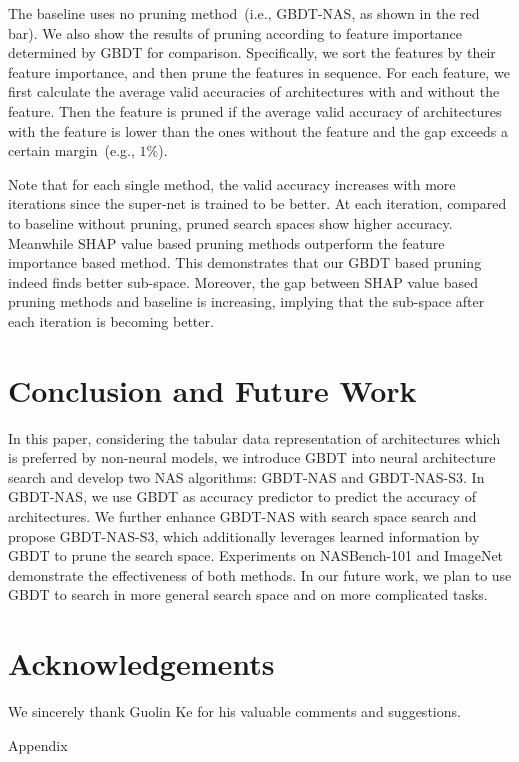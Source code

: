 \documentclass{article}
\begin{document}
The baseline uses no pruning method~(i.e., GBDT-NAS, as shown in the red bar). We also show the results of pruning according to feature importance determined by GBDT for comparison. Specifically, we sort the features by their feature importance, and then prune the features in sequence. For each feature, we first calculate the average valid accuracies of architectures with and without the feature. Then the feature is pruned if the average valid accuracy of architectures with the feature is lower than the ones without the feature and the gap exceeds a certain margin~(e.g., $1\%$). 

Note that for each single method, the valid accuracy increases with more iterations since the super-net is trained to be better. At each iteration, compared to baseline without pruning, pruned search spaces show higher accuracy. Meanwhile SHAP value based pruning methods outperform the feature importance based method.  This demonstrates that our GBDT based pruning indeed finds better sub-space. Moreover, the gap between SHAP value based pruning methods and baseline is increasing, implying that the sub-space after each iteration is becoming better.

\section{Conclusion and Future Work}
In this paper, considering the tabular data representation of architectures which is preferred by non-neural models, we introduce GBDT into neural architecture search and develop two NAS algorithms: GBDT-NAS and GBDT-NAS-S3. In GBDT-NAS, we use GBDT as accuracy predictor to predict the accuracy of architectures. We further enhance GBDT-NAS with search space search and propose GBDT-NAS-S3, which additionally leverages learned information by GBDT to prune the search space. Experiments on NASBench-101 and ImageNet demonstrate the effectiveness of both methods. In our future work, we plan to use GBDT to search in more general search space and on more complicated tasks.

\section*{Acknowledgements}
We sincerely thank Guolin Ke for his valuable comments and suggestions.





\clearpage
\centerline{\Huge{Appendix}}
\end{document}
